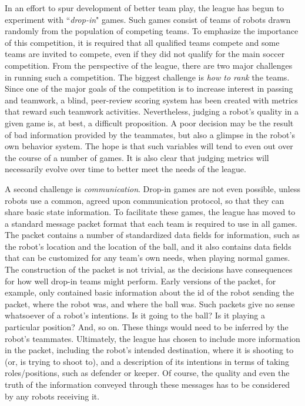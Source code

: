 \documentclass{llncs}
\begin{document}
In an effort to spur development of better team play, the league has
begun to experiment with ``\textit{drop-in}" games. Such games consist of
teams of robots drawn randomly from the population of competing
teams. To emphasize the
importance of this competition, it is required that all qualified teams compete and some teams
are invited to compete, even if they did not qualify for the main soccer
competition. From the perspective of the league, there are two major challenges
in running such a competition. The biggest challenge is \textit{how to rank}
the teams. Since one of the major goals of the competition is to increase interest in
passing and teamwork, a blind, peer-review scoring system has been created with metrics
that reward such teamwork activities. Nevertheless, judging a robot's quality in
a given game is, at best, a difficult proposition. A poor decision may be
the result of bad information provided by the teammates, but also a glimpse in the robot's
own behavior system. The hope is that such variables will tend to even
out over the course of a number of games. It is also clear that judging
metrics will necessarily evolve over time to better meet the needs of the
league.

A second challenge is \textit{communication}. Drop-in games are not even possible,
unless robots use a common, agreed upon communication
protocol, so that they can share basic state information.  To facilitate these
games, the league has moved to a standard message packet format that each team
is required to use in all games. The packet contains a number of standardized data fields
for information, such as the robot's location and the location of the ball, and it
also contains data fields that can be customized for any team's own needs, when
playing normal games. The construction of the packet is not trivial, as
the decisions have consequences for how well drop-in teams might perform.
Early versions of the packet, for example, only contained basic information
about the id of the robot sending the packet, where the robot was, and where the ball was. Such packets give no
sense whatsoever of a robot's intentions. Is it going to the ball? Is it playing
a particular position? And, so on. These things would need to be inferred by the
robot's teammates. Ultimately, the league has chosen to include more information
in the packet, including the robot's intended destination, where it is shooting
to (or, is trying to shoot to), and a description of its intentions in terms of taking roles/positions, such
as defender or keeper. Of course, the quality and even the truth of the
information conveyed through these messages has to be considered by any robots receiving it.
\end{document}
